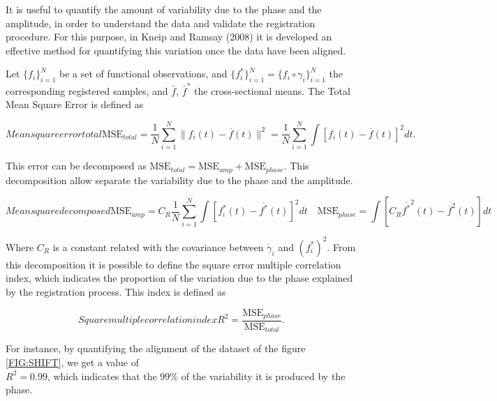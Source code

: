 It is useful to quantify the amount of variability due to the phase and the
amplitude, in order to understand the data and validate the registration
procedure. For this purpose, in Kneip and Ramsay (2008)
\cite{RamsayAlois2008} it is developed an effective method for quantifying
this variation once the data have been aligned.

Let $\{f_i\}_{i=1}^N$ be a set of functional observations, and
$\{f^*_i\}_{i=1}^N = \{f_i \circ \gamma_i\}_{i=1}^N$ the corresponding registered
samples, and $\bar f$, $\bar f^*$ the
cross-sectional means. The Total Mean Square Error is defined as

\begin{equation}[]{Mean square error total}
\text{MSE}_{total}=  \frac{1}{N}\sum_{i=1}^{N} \|f_i(t)-\overline f(t)\|^2 =
\frac{1}{N}\sum_{i=1}^{N}\int[f_i(t)-\overline f(t)]^2dt .
\end{equation}

This error can be decomposed as
$\text{MSE}_{total} = \text{MSE}_{amp} + \text{MSE}_{phase}$. This decomposition allow separate
the variability due to the phase and the amplitude.

\begin{equation}[]{Mean square decomposed}
\text{MSE}_{amp} =  C_R \frac{1}{N}
        \sum_{i=1}^{N} \int \left [ f^*_i(t) - \overline{f^*}(t) \right ]^2 dt \quad
\text{MSE}_{phase}=
        \int \left [C_R \overline{f^*}^2(t) - \overline{f}^2(t) \right]dt
\end{equation}


Where $C_R$ is a constant related with the covariance between $\dot \gamma_i$
and $(f_i^*)^2$.
From this decomposition it is possible to define the
square error multiple correlation index, which indicates the proportion of the
variation due to the phase
explained by the registration process. This index is defined as

\begin{equation}[]{Square multiple correlation index}
R^2 = \frac{\text{MSE}_{phase}}{\text{MSE}_{total}}.
\end{equation}

For instance, by quantifying the alignment of the dataset of the figure
\ref{FIG:SHIFT}, we get a value of \\ $R^2=0.99$, which indicates that the $99\%$ of
the variability it is produced by the phase.

